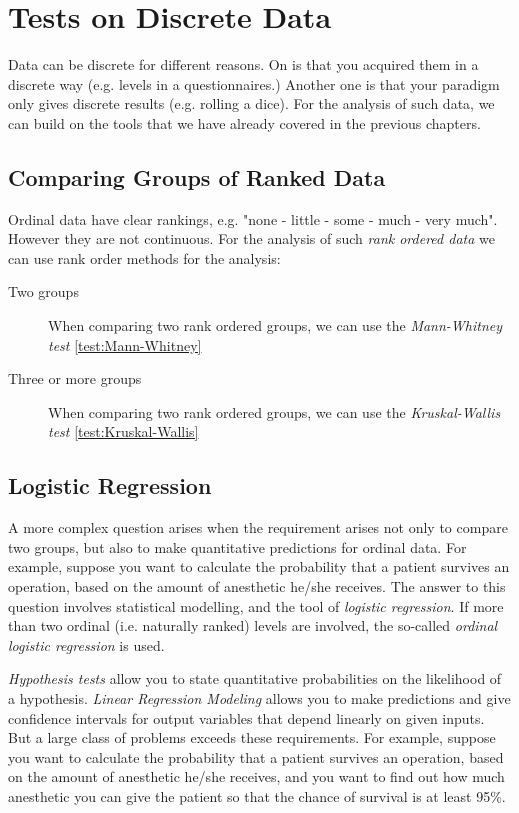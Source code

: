 \chapter{Tests on Discrete Data}

Data can be discrete for different reasons. On is that you acquired them in a discrete way (e.g. levels in a questionnaires.) Another one is that your paradigm only gives discrete results (e.g. rolling a dice). For the analysis of such data, we can build on the tools that we have already covered in the previous chapters.

\section{Comparing Groups of Ranked Data}

Ordinal data have clear rankings, e.g. "none - little - some - much - very much". However they are not continuous. For the analysis of such \emph{rank ordered data} we can use rank order methods for the analysis:

\begin{description}
  \item[Two groups] When comparing two rank ordered groups, we can use the \emph{Mann-Whitney test} \ref{test:Mann-Whitney}
  \item[Three or more groups]  When comparing two rank ordered groups, we can use the \emph{Kruskal-Wallis test} \ref{test:Kruskal-Wallis}

\end{description}

\section{Logistic Regression}

A more complex question arises when the requirement arises not only to compare two groups, but also to make quantitative predictions for ordinal data. For example, suppose you want to calculate the probability that a patient survives an operation, based on the amount of anesthetic he/she receives. The answer to this question involves statistical modelling, and the tool of \emph{logistic regression}. If more than two ordinal (i.e. naturally ranked) levels are involved, the so-called \emph{ordinal logistic regression} is used.

\emph{Hypothesis tests} allow you to state quantitative probabilities on the likelihood of a hypothesis. \emph{Linear Regression Modeling} allows you to make predictions and give confidence intervals for output variables that depend linearly on given inputs. But a large class of problems exceeds these requirements. For example, suppose you want to calculate the probability that a patient survives an operation, based on the amount of anesthetic he/she receives, and you want to find out how much anesthetic you can give the patient so that the chance of survival is at least 95\%.

